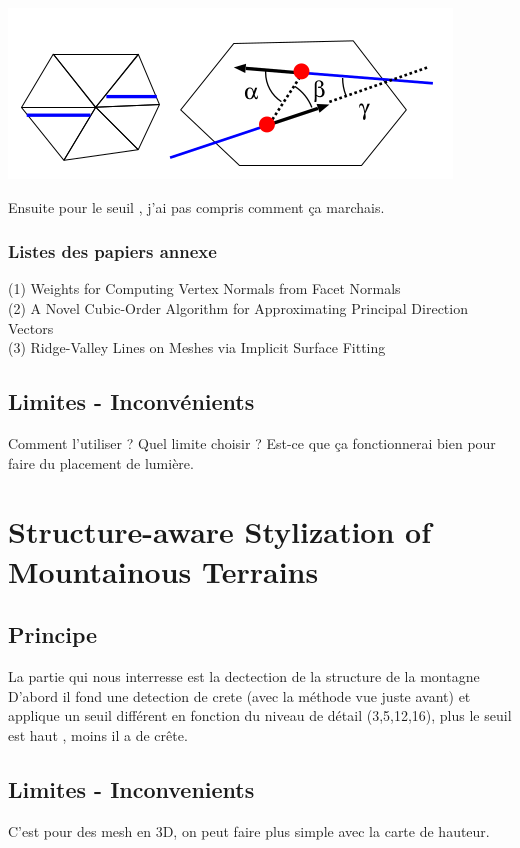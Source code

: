 \documentclass[a4paper]{article}
\begin{document}
\begin{center}
\includegraphics[scale=0.5]{Crest_detection.png}
\end{center}

Ensuite pour le seuil , j'ai pas compris comment ça marchais. 



\subsubsection{Listes des papiers annexe}

(1) Weights for Computing Vertex Normals from Facet Normals\\
(2) A Novel Cubic-Order Algorithm for Approximating Principal Direction Vectors \\
(3) Ridge-Valley Lines on Meshes via Implicit Surface Fitting
\subsection{Limites - Inconvénients}
Comment l'utiliser ?
Quel limite choisir ? 
Est-ce que ça fonctionnerai bien pour faire du placement de lumière. 


\section{Structure-aware Stylization of Mountainous Terrains}
\subsection{Principe}
La partie qui nous interresse est la dectection de la structure de la montagne
D'abord il fond une detection de crete (avec la méthode vue juste avant) et applique un seuil différent en fonction du niveau de détail (3,5,12,16), plus le seuil est haut , moins il a de crête. 




\subsection{Limites - Inconvenients}
C'est pour des mesh en 3D, on peut faire plus simple avec la carte de hauteur. 
\end{document}
